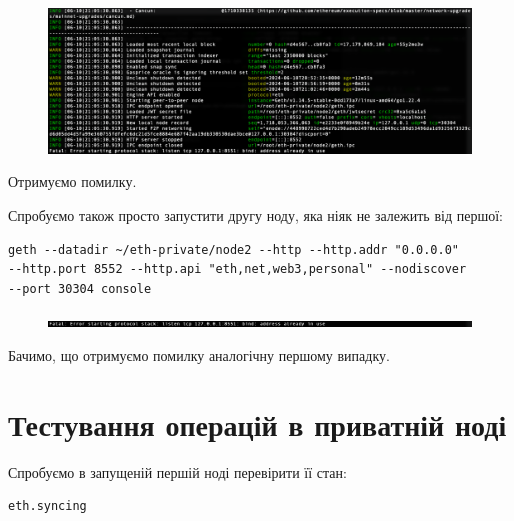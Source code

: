 \begin{figure}[ht]
        \centering
        \includegraphics[scale=0.35]{IMAGES/launch23.png}
        \label{fig_pacman}
\end{figure}
\vspace{-0.75cm}
\newpage
Отримуємо помилку.

\vspace{0.65cm}
Спробуємо також просто запустити другу ноду, яка ніяк не залежить від першої:
\begin{verbatim}
geth --datadir ~/eth-private/node2 --http --http.addr "0.0.0.0" 
--http.port 8552 --http.api "eth,net,web3,personal" --nodiscover
--port 30304 console
\end{verbatim}

\vspace{-0.5cm}

\begin{figure}[ht]
        \centering
        \includegraphics[scale=0.35]{IMAGES/errorLaunch2.png}
        \label{fig_pacman}
\end{figure}
\vspace{-0.5cm}
Бачимо, що отримуємо помилку аналогічну першому випадку.

\section{Тестування операцій в приватній ноді}

Спробуємо в запущеній першій ноді перевірити її стан:
\begin{verbatim}
eth.syncing
\end{verbatim}

\vspace{-0.5cm}


